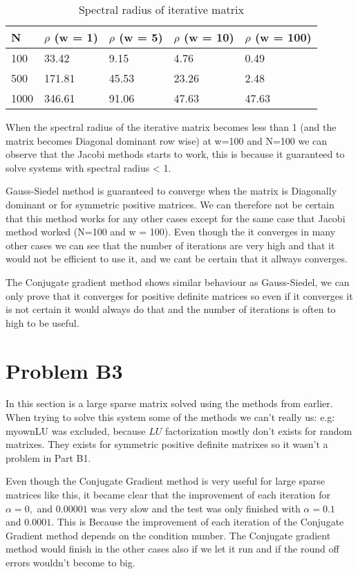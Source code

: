 \documentclass[a4paper]{article}
\begin{document}
\begin{table}[ht!]
\centering
\begin{tabular}{lllll}\textbf{N}&  $\rho$ (w = 1)&  $\rho$ (w = 5)&  $\rho$ (w = 10)&  $\rho$ (w = 100)\\ \hline

 100&  33.42&  9.15&  4.76&  0.49\\
 500&  171.81&  45.53&  23.26&  2.48\\
 1000&  346.61&  91.06&  47.63&   47.63\\ \hline
\end{tabular}
\caption{Spectral radius of iterative matrix}
\label{tab:tab1}
\end{table}

\newpage

When the spectral radius of the iterative matrix becomes less than 1 (and the matrix becomes Diagonal dominant row wise) at w=100 and N=100 we can observe that the Jacobi methods starts to work, this is because it guaranteed to solve systems with spectral radius < 1. 



Gauss-Siedel method is guaranteed to converge when the matrix is Diagonally dominant or for symmetric positive matrices. We can therefore not be certain that this method works for any other cases except for the same case that Jacobi method worked (N=100 and w = 100). Even though the it converges in many other cases we can see that the number of iterations are very high and that it would not be efficient to use it, and we cant be certain that it allways converges. 

The Conjugate gradient method shows similar behaviour as Gauss-Siedel, we can only prove that it converges for positive definite matrices so even if it converges it is not certain it would always do that and the number of iterations is often to high to be useful.


\newpage

\section*{Problem B3}
In this section is a large sparse matrix solved using the methods from earlier. When trying to solve this system some of the methods we can't really us: e.g: myownLU  was excluded, because $LU$ factorization mostly don't exists for random matrixes. They exists for symmetric positive definite matrixes so it wasn't a problem in Part B1. 

Even though the Conjugate Gradient method is very useful for large sparse matrices like this, it became clear that the improvement of each iteration for  $\alpha = 0,$ and $0.00001$  was very slow and the test was only finished with $\alpha =0.1 $ and $0.0001$. This is Because the improvement of each iteration of the Conjugate Gradient method depends on the condition number. The Conjugate gradient method would finish in the other cases also if we let it run and if the round off errors wouldn’t become to big. 
\end{document}
